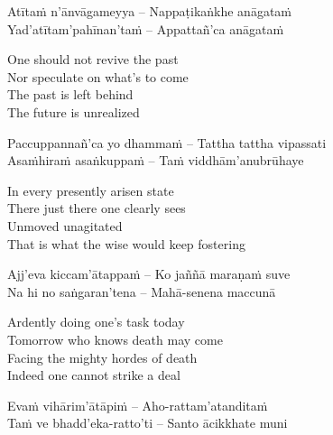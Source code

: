 \begin{verses}
  Atītaṁ n'ānvāgameyya – Nappaṭikaṅkhe anāgataṁ\\
  Yad'atītam'pahīnan'taṁ – Appattañ'ca anāgataṁ
\end{verses}

\begin{english-verses}
  One should not revive the past\\
  Nor speculate on what's to come\\
  The past is left behind\\
  The future is unrealized
\end{english-verses}

\begin{verses}
  Paccuppannañ'ca yo dhammaṁ – Tattha tattha vipassati\\
  Asaṁhiraṁ asaṅkuppaṁ – Taṁ viddhām'anubrūhaye
\end{verses}

\begin{english-verses}
  In every presently arisen state\\
  There just there one clearly sees\\
  Unmoved unagitated\\
  That is what the wise would keep fostering\makeatletter\hyperlink{endnote43-appendix}\makeatother
\end{english-verses}

\begin{verses}
  Ajj'eva kiccam'ātappaṁ – Ko jaññā maraṇaṁ suve\\
  Na hi no saṅgaran'tena – Mahā-senena maccunā
\end{verses}

\begin{english-verses}
  Ardently doing one's task today\\
  Tomorrow who knows death may come\\
  Facing the mighty hordes of death\\
  Indeed one cannot strike a deal
\end{english-verses}

\begin{verses}
  Evaṁ vihārim'ātāpiṁ – Aho-rattam'atanditaṁ\\
  Taṁ ve bhadd'eka-ratto'ti – Santo ācikkhate muni
\end{verses}

